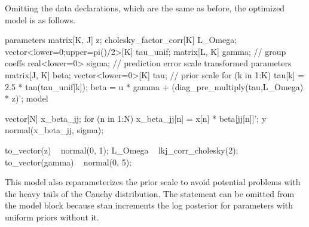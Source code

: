 Omitting the data declarations, which are the same as before, the
optimized model is as follows.
%
\begin{stancode}
parameters {
  matrix[K, J] z;
  cholesky_factor_corr[K] L_Omega;  
  vector<lower=0;upper=pi()/2>[K] tau_unif;  
  matrix[L, K] gamma;                         // group coeffs
  real<lower=0> sigma;                       // prediction error scale
}
transformed parameters {
  matrix[J, K] beta;
  vector<lower=0>[K] tau;     // prior scale
  for (k in 1:K) tau[k] = 2.5 * tan(tau_unif[k]);
  beta = u * gamma + (diag_pre_multiply(tau,L_Omega) * z)';
}
model {
  vector[N] x_beta_jj;
  for (n in 1:N)
    x_beta_jj[n] = x[n] * beta[jj[n]]';
  y ~ normal(x_beta_jj, sigma);

  to_vector(z) ~ normal(0, 1); 
  L_Omega ~ lkj_corr_cholesky(2);
  to_vector(gamma) ~ normal(0, 5);
}
\end{stancode}

This model also reparameterizes the prior scale  to avoid potential problems with the heavy tails of the Cauchy distribution. The statement  can be omitted from the model block because stan increments the log posterior for parameters with uniform priors without it.




